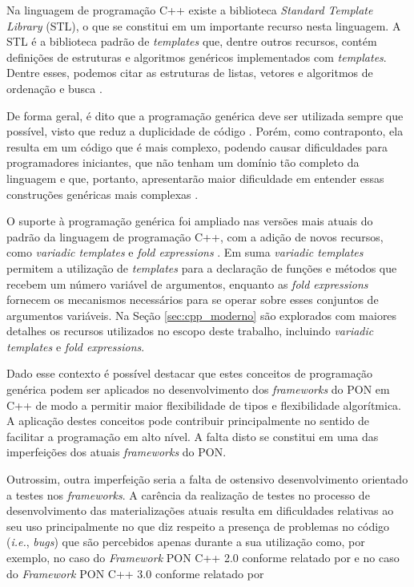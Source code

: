 Na linguagem de programação C++ existe a biblioteca \textit{Standard Template
  Library} (STL), o que se constitui em um importante recurso nesta linguagem. A
STL é a biblioteca padrão de \textit{templates} que, dentre outros recursos,
contém definições de estruturas e algoritmos genéricos implementados com
\textit{templates}. Dentre esses, podemos citar as estruturas de listas,
vetores e algoritmos de ordenação e busca \cite{iso_cpp17}.

De forma geral, é dito que a programação genérica deve ser utilizada sempre que
possível, visto que reduz a duplicidade de código \cite{alexandrescu_2001}.
Porém, como contraponto, ela resulta em um código que é mais complexo, podendo causar
dificuldades para programadores iniciantes, que não tenham um domínio tão
completo da linguagem e que, portanto, apresentarão maior dificuldade em entender
essas construções genéricas mais complexas \cite{stepanov_2015}.

O suporte à programação genérica foi ampliado nas versões mais atuais do padrão
da linguagem de programação C++, com a adição de novos recursos, como
\textit{variadic templates} e \textit{fold expressions}
\cite{grimm_2020,bjarne_2020}. Em suma \textit{variadic templates} permitem a
utilização de \textit{templates} para a declaração de funções e métodos que
recebem um número variável de argumentos, enquanto as \textit{fold expressions}
fornecem os mecanismos necessários para se operar sobre esses conjuntos de
argumentos variáveis. Na Seção \ref{sec:cpp_moderno} são explorados com maiores
detalhes os recursos utilizados no escopo deste trabalho, incluindo
\textit{variadic templates} e \textit{fold expressions}.

Dado esse contexto é possível destacar que estes conceitos de programação
genérica podem ser aplicados no desenvolvimento dos \textit{frameworks} do PON
em C++ de modo a permitir maior flexibilidade de tipos e flexibilidade
algorítmica. A aplicação destes conceitos pode contribuir principalmente no
sentido de facilitar a programação em alto nível. A falta disto se constitui em
uma das imperfeições dos atuais \textit{frameworks} do PON. 

Outrossim, outra imperfeição seria a falta de ostensivo desenvolvimento
orientado a testes nos \textit{frameworks}. A carência da realização de testes
no processo de desenvolvimento das materializações atuais resulta em
dificuldades relativas ao seu uso principalmente no que diz respeito a presença
de problemas no código (\textit{i.e.}, \textit{bugs}) que são percebidos apenas
durante a sua utilização como, por exemplo, no caso do \textit{Framework} PON
C++ 2.0 conforme relatado por  e no caso do
\textit{Framework} PON C++ 3.0 conforme relatado por


